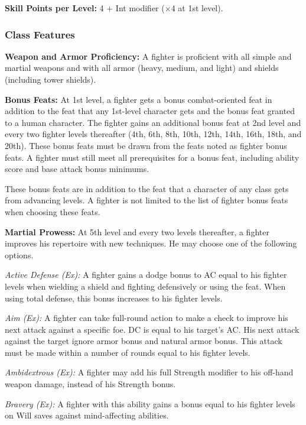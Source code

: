 \textbf{Skill Points per Level:} 4 + Int modifier ($\times4$ at 1st level).

\subsubsection{Class Features}
\textbf{Weapon and Armor Proficiency:} A fighter is proficient with all simple and martial weapons and with all armor (heavy, medium, and light) and shields (including tower shields).

\textbf{Bonus Feats:} At 1st level, a fighter gets a bonus combat-oriented feat in addition to the feat that any 1st-level character gets and the bonus feat granted to a human character. The fighter gains an additional bonus feat at 2nd level and every two fighter levels thereafter (4th, 6th, 8th, 10th, 12th, 14th, 16th, 18th, and 20th). These bonus feats must be drawn from the feats noted as fighter bonus feats. A fighter must still meet all prerequisites for a bonus feat, including ability score and base attack bonus minimums.

These bonus feats are in addition to the feat that a character of any class gets from advancing levels. A fighter is not limited to the list of fighter bonus feats when choosing these feats.

\textbf{Martial Prowess:} At 5th level and every two levels thereafter, a fighter improves his repertoire with new techniques. He may choose one of the following options.

\textit{Active Defense (Ex):} A fighter gains a dodge bonus to AC equal to \onequarter his fighter levels when wielding a shield and fighting defensively or using the  feat. When using total defense, this bonus increases to \onehalf his fighter levels.

\textit{Aim (Ex):} A fighter can take full-round action to make a  check to improve his next attack against a specific foe. DC is equal to his target's AC. His next attack against the target ignore armor bonus and natural armor bonus. This attack must be made within a number of rounds equal to \onequarter his fighter levels.


\textit{Ambidextrous (Ex):} A fighter may add his full Strength modifier to his off-hand weapon damage, instead of \onehalf his Strength bonus.

\textit{Bravery (Ex):} A fighter with this ability gains a bonus equal to \onehalf his fighter levels on Will saves against mind-affecting abilities.

